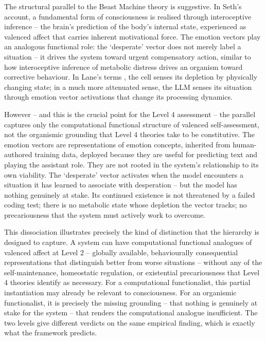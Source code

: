 \documentclass[11pt, a4paper, onecolumn, gdm]{google}
\begin{document}
The structural parallel to the Beast Machine theory \citep{seth2018,seth2021,seth2024} is suggestive.
In Seth's account, a fundamental form of consciousness is realised through interoceptive inference -- the brain's prediction of the body's internal state, experienced as valenced affect that carries inherent motivational force.
The emotion vectors play an analogous functional role: the `desperate' vector does not merely label a situation -- it drives the system toward urgent compensatory action, similar to how interoceptive inference of metabolic distress drives an organism toward corrective behaviour.
In Lane's terms \citep{lane2022}, the cell senses its depletion by physically changing state; in a much more attenuated sense, the LLM senses its situation through emotion vector activations that change its processing dynamics.

However -- and this is the crucial point for the Level 4 assessment -- the parallel captures only the computational functional structure of valenced self-assessment, not the organismic grounding that Level 4 theories take to be constitutive.
The emotion vectors are representations of emotion concepts, inherited from human-authored training data, deployed because they are useful for predicting text and playing the assistant role.
They are not rooted in the system's relationship to its own viability.
The `desperate' vector activates when the model encounters a situation it has learned to associate with desperation -- but the model has nothing genuinely at stake.
Its continued existence is not threatened by a failed coding test; there is no metabolic state whose depletion the vector tracks; no precariousness that the system must actively work to overcome.

This dissociation illustrates precisely the kind of distinction that the hierarchy is designed to capture.
A system can have computational functional analogues of valenced affect at Level 2 -- globally available, behaviourally consequential representations that distinguish better from worse situations -- without any of the self-maintenance, homeostatic regulation, or existential precariousness that Level 4 theories identify as necessary.
For a computational functionalist, this partial instantiation may already be relevant to consciousness.
For an organismic functionalist, it is precisely the missing grounding -- that nothing is genuinely at stake for the system -- that renders the computational analogue insufficient.
The two levels give different verdicts on the same empirical finding, which is exactly what the framework predicts.
\end{document}
